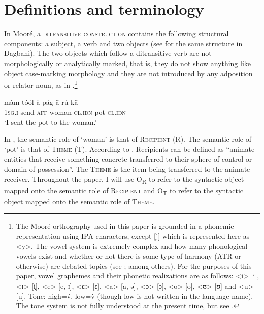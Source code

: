 \documentclass[output=paper]{langsci/langscibook}
\begin{document}
\section{Definitions and terminology}\label{§2:definitions.pacchiarotti}

In Mooré, a \textsc{ditransitive construction} contains the following structural components: a subject, a verb and two objects (see \citealt{olawsky1999} for the same structure in Dagbani). The two objects which follow a ditransitive verb are not morphologically or analytically marked, that is, they do not show anything like object case-marking morphology and they are not introduced by any adposition or relator noun, as in .\footnote{The Mooré orthography used in this paper is grounded in a phonemic representation using IPA characters, except [j] which is represented here as {\textless}y>. The vowel system is extremely complex and how many phonological vowels exist and whether or not there is some type of harmony (ATR or otherwise) are debated topics (see \citealt{peterson1971,canu1974,rennison1990,nikiema2000,calamaibertinetto2005}; among others). For the purposes of this paper, vowel graphemes and their phonetic realizations are as follows: {\textless}i> [i], {\textless}ɪ> [i̙], {\textless}e> [e, ɪ], {\textless}ɛ> [ɛ], {\textless}a> [a, ə], {\textless}ɔ> [ɔ], {\textless}o> [o], {\textless}ʊ> [ʊ] and {\textless}u> [u]. Tone: high=\'{v}, low=\`{v} (though low is not written in the language name). The tone system is not fully understood at the present time, but see \citet{peterson1971}.}

\ea
\label{ex:pacchiarotti:1}
\gll màm    tóól-à        pág-\`{ã}             rú-k\`{ã}\\
\textsc{1sg.i}    send-\textsc{aff}      woman-\textsc{cl.idn}       pot-\textsc{cl.idn} \\
\glt `I sent the pot to the woman.'  
\z

In , the semantic role of `woman' is that of \textsc{Recipient} (R).  The semantic role of `pot' is that of \textsc{Theme} (T). According to \citet[274]{kittila2005}, Recipients can be defined as ``animate entities that receive something concrete transferred to their sphere of control or domain of possession''. The \textsc{Theme} is the item being transferred to the animate receiver. Throughout the paper, I will use O\textsubscript{R} to refer to the syntactic object mapped onto the semantic role of \textsc{Recipient} and O\textsubscript{T} to refer to the syntactic object mapped onto the semantic role of \textsc{Theme}. 
\end{document}
